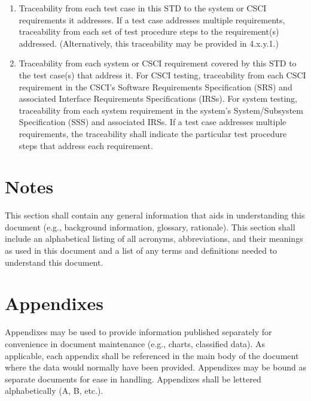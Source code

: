 \documentclass{fidata-report-template}
\begin{document}
\begin{enumerate}
\itemsep1pt\parskip0pt
\item
  Traceability from each test case in this STD to the system or CSCI
  requirements it addresses. If a test case addresses multiple
  requirements, traceability from each set of test procedure steps to
  the requirement(s) addressed. (Alternatively, this traceability may be
  provided in 4.x.y.1.)
\item
  Traceability from each system or CSCI requirement covered by this STD
  to the test case(s) that address it. For CSCI testing, traceability
  from each CSCI requirement in the CSCI's Software Requirements
  Specification (SRS) and associated Interface Requirements
  Specifications (IRSs). For system testing, traceability from each
  system requirement in the system's System/Subsystem Specification
  (SSS) and associated IRSs. If a test case addresses multiple
  requirements, the traceability shall indicate the particular test
  procedure steps that address each requirement.
\end{enumerate}

\section{Notes}

This section shall contain any general information that aids in
understanding this document (e.g., background information, glossary,
rationale). This section shall include an alphabetical listing of all
acronyms, abbreviations, and their meanings as used in this document and
a list of any terms and definitions needed to understand this document.

\appendix

\section{Appendixes}

Appendixes may be used to provide information published separately for
convenience in document maintenance (e.g., charts, classified data). As
applicable, each appendix shall be referenced in the main body of the
document where the data would normally have been provided. Appendixes
may be bound as separate documents for ease in handling. Appendixes
shall be lettered alphabetically (A, B, etc.).
\end{document}
